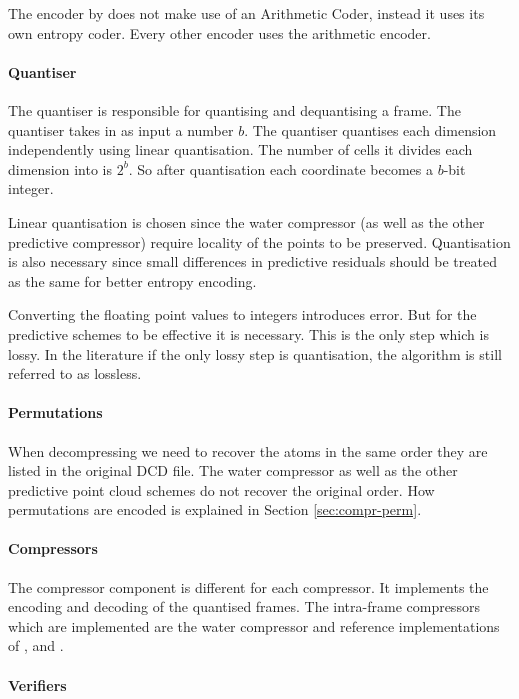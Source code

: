 \documentclass{report}
\begin{document}
The encoder by \citep{omeltchenko2000sls} does not make use of an Arithmetic
Coder, instead it uses its own entropy coder. Every other encoder uses the
arithmetic encoder.


\paragraph{Quantiser}

The quantiser is responsible for quantising and dequantising a frame. The
quantiser takes in as input a number $b$. The quantiser quantises each
dimension independently using linear quantisation. The number of cells it
divides each dimension into is $2^b$. So after quantisation each coordinate
becomes a $b$-bit integer.

Linear quantisation is chosen since the water compressor (as well as the other
predictive compressor) require locality of the points to be
preserved. Quantisation is also necessary since small differences in
predictive residuals should be treated as the same for better entropy
encoding.

Converting the floating point values to integers introduces error. But for the
predictive schemes to be effective it is necessary. This is the only step
which is lossy. In the literature if the only lossy step is quantisation, the
algorithm is still referred to as lossless.


\paragraph{Permutations}

When decompressing we need to recover the atoms in the same order they are
listed in the original DCD file. The water compressor as well as the other
predictive point cloud schemes do not recover the original order. How
permutations are encoded is explained in Section \ref{sec:compr-perm}.


\paragraph{Compressors}

The compressor component is different for each compressor. It implements the
encoding and decoding of the quantised frames. The intra-frame compressors
which are implemented are the water compressor and reference implementations
of \citep{omeltchenko2000sls}, \citep{gumholdcomp} and
\citep{devillers2000gci}.


\paragraph{Verifiers}
\end{document}

